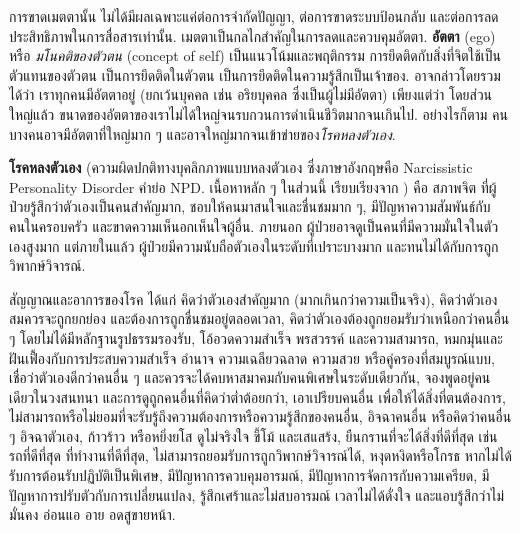 {\begin{shaded}
การขาดเมตตานั้น ไม่ได้มีผลเฉพาะแค่ต่อการจำกัดปัญญา, ต่อการขาดระบบป้อนกลับ และต่อการลดประสิทธิภาพในการสื่อสารเท่านั้น.
เมตตาเป็นกลไกสำคัญในการลดและควบคุมอัตตา.
\textbf{อัตตา} (ego) หรือ \textit{มโนคติของตัวตน} (concept of self)
เป็นแนวโน้มและพฤติกรรม%
การยึดติดกับสิ่งที่จิตใช้เป็นตัวแทนของตัวตน
เป็นการยึดติดในตัวตน 
เป็นการยึดติดในความรู้สึกเป็นเจ้าของ.
อาจกล่าวโดยรวมได้ว่า เราทุกคนมีอัตตาอยู่ (ยกเว้นบุคคล เช่น อริยบุคคล ซึ่งเป็นผู้ไม่มีอัตตา)
เพียงแต่ว่า โดยส่วนใหญ่แล้ว ขนาดของอัตตาของเราไม่ได้ใหญ่จนรบกวนการดำเนินชีวิตมากจนเกินไป.
อย่างไรก็ตาม คนบางคนอาจมีอัตตาที่ใหญ่มาก ๆ 
และอาจใหญ่มากจนเข้าข่ายของ\textit{โรคหลงตัวเอง}.

\textbf{โรคหลงตัวเอง} (ความผิดปกติทางบุคลิกภาพแบบหลงตัวเอง ซึ่งภาษาอังกฤษคือ Narcissistic Personality Disorder คำย่อ NPD. เนื้อหาหลัก ๆ ในส่วนนี้ เรียบเรียงจาก \cite{MayoClinic})
คือ
สภาพจิต ที่ผู้ป่วยรู้สึกว่าตัวเองเป็นคนสำคัญมาก, ชอบให้คนมาสนใจและชื่นชมมาก ๆ,
มีปัญหาความสัมพันธ์กับคนในครอบครัว และขาดความเห็นอกเห็นใจผู้อื่น.
ภายนอก ผู้ป่วยอาจดูเป็นคนที่มีความมั่นใจในตัวเองสูงมาก แต่ภายในแล้ว ผู้ป่วยมีความนับถือตัวเองในระดับที่เปราะบางมาก และทนไม่ได้กับการถูกวิพากษ์วิจารณ์.

สัญญาณและอาการของโรค ได้แก่
คิดว่าตัวเองสำคัญมาก (มากเกินกว่าความเป็นจริง),
คิดว่าตัวเองสมควรจะถูกยกย่อง
และต้องการถูกชื่นชมอยู่ตลอดเวลา,
คิดว่าตัวเองต้องถูกยอมรับว่าเหนือกว่าคนอื่น ๆ โดยไม่ได้มีหลักฐานรูปธรรมรองรับ,
โอ้อวดความสำเร็จ พรสวรรค์ และความสามารถ,
หมกมุ่นและฝันเฟื้องกับการประสบความสำเร็จ อำนาจ ความเฉลียวฉลาด ความสวย หรือคู่ครองที่สมบูรณ์แบบ,
เชื่อว่าตัวเองดีกว่าคนอื่น ๆ และควรจะได้คบหาสมาคมกับคนพิเศษในระดับเดียวกัน,
จองพูดอยู่คนเดียวในวงสนทนา และการดูถูกคนอื่นที่คิดว่าต่ำต้อยกว่า,
เอาเปรียบคนอื่น เพื่อให้ได้สิ่งที่ตนต้องการ,
ไม่สามารถหรือไม่ยอมที่จะรับรู้ถึงความต้องการหรือความรู้สึกของคนอื่น,
อิจฉาคนอื่น หรือคิดว่าคนอื่น ๆ อิจฉาตัวเอง,
ก้าวร้าว หรือหยิ่งยโส ดูไม่จริงใจ ขี้โม้ และเสแสร้ง,
ยืนกรานที่จะได้สิ่งที่ดีที่สุด เช่น รถที่ดีที่สุด ที่ทำงานที่ดีที่สุด,
ไม่สามารถยอมรับการถูกวิพากษ์วิจารณ์ได้,
หงุดหงิดหรือโกรธ หากไม่ได้รับการต้อนรับปฏิบัติเป็นพิเศษ,
มีปัญหาการควบคุมอารมณ์,
มีปัญหาการจัดการกับความเครียด,
มีปัญหาการปรับตัวกับการเปลี่ยนแปลง,
รู้สึกเศร้าและไม่สบอารมณ์ เวลาไม่ได้ดั่งใจ
และแอบรู้สึกว่าไม่มั่นคง อ่อนแอ อาย อดสูขายหน้า.


\end{shaded}}
